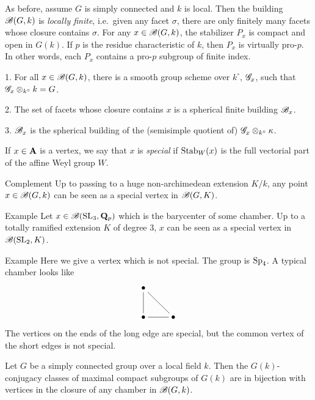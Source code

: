 As before, assume $G$ is simply connected and $k$ is local. Then the building 
$\mathscr{B}(G,k)$ is \emph{locally finite}, i.e.~given any facet $\sigma$, there are only 
finitely many facets whose closure contains $\sigma$. For any $x\in \mathscr{B}(G,k)$, the 
stabilizer $P_x$ is compact and open in $G(k)$. If $p$ is the residue characteristic 
of $k$, then $P_x$ is virtually pro-$p$. In other words, each $P_x$ contains a 
pro-$p$ subgroup of finite index. 

\begin{theo}
1. For all $x\in \mathscr{B}(G,k)$, there is a smooth group scheme over $k^\circ$, 
$\mathscr{G}_x$, such that $\mathscr{G}_x\otimes_{k^\circ} k = G$. 

2. The set of facets whose 
closure contains $x$ is a spherical finite building $\mathscr{B}_x$. 

3. $\mathscr{B}_x$ is the spherical building of the (semisimple quotient of) 
$\mathscr{G}_x\otimes_{k^\circ} \kappa$.  
\end{theo}

If $x\in \mathbf{A}$ is a vertex, we say that $x$ is \emph{special} if 
$\operatorname{Stab}_W(x)$ is the full vectorial part of the affine Weyl group 
$W$. 

\begin{enonce}{Complement}
Up to passing to a huge non-archimedean extension $K/k$, any point 
$x\in \mathscr{B}(G,k)$ can be seen as a special vertex in $\mathscr{B}(G,K)$. 
\end{enonce}

\begin{enonce}[remark]{Example}
Let $x\in \mathscr{B}(\operatorname{SL}_3,\mathbf{Q}_p)$ which is the barycenter of some chamber. 
Up to a totally ramified extension $K$ of degree $3$, $x$ can be seen as a special 
vertex in $\mathscr{B}(\operatorname{SL}_2,K)$. 
\end{enonce}

\begin{enonce}[remark]{Example}
Here we give a vertex which is not special. The group is $\operatorname{Sp}_4$. A 
typical chamber looks like 
\[\xymatrix{
  \bullet \ar@{-}[d] \ar@{-}[dr] \\
  \bullet \ar@{-}[r] 
    & \bullet 
}\]
The vertices on the ends of the long edge are special, but the common vertex 
of the short edges is not special. 
\end{enonce}

\begin{theo}
Let $G$ be a simply connected group over a local field $k$. Then the 
$G(k)$-conjugacy classes of maximal compact subgroups of $G(k)$ are in 
bijection with vertices in the closure of any chamber in $\mathscr{B}(G,k)$. 
\end{theo}

